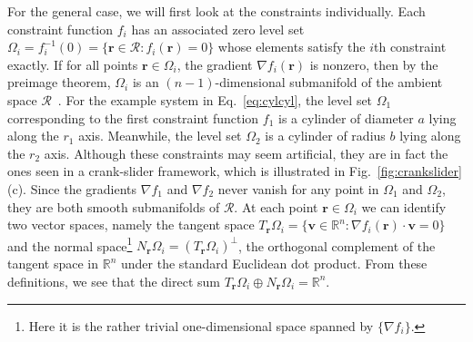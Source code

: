 For the general case, we will first look at the constraints individually.
Each constraint function $f_i$ has an associated zero level set $\Omega_i = f_i^{-1}(0) = \{\bm{r} \in \mathscr{R}: f_i(\bm{r}) = 0\}$ whose elements satisfy the $i$th constraint exactly.
If for all points $\bm{r} \in \Omega_{i}$, the gradient $\nabla f_i(\bm{r})$ is nonzero, then by the preimage theorem, $\Omega_i$ is an $(n-1)$-dimensional submanifold of the ambient space $\mathscr{R}$~\cite{guillemin1974,lee2013}.
For the example system in Eq.~\eqref{eq:cylcyl}, the level set $\Omega_1$ corresponding to the first constraint function $f_1$ is a cylinder of diameter $a$ lying along the $r_{1}$ axis.
Meanwhile, the level set $\Omega_2$ is a cylinder of radius $b$ lying along the $r_{2}$ axis.
Although these constraints may seem artificial, they are in fact the ones seen in a crank-slider framework, which is illustrated in Fig.~\ref{fig:crankslider}(c).
Since the gradients $\nabla f_1$ and $\nabla f_2$ never vanish for any point in $\Omega_1$ and $\Omega_2$, they are both smooth submanifolds of $\mathscr{R}$.
At each point $\bm{r} \in \Omega_i$ we can identify two vector spaces, namely the tangent space $T_{\bm{r}}\Omega_i = \{\bm{v} \in \mathbb{R}^n: \nabla f_i(\bm{r})\cdot \bm{v} = 0\}$ and the normal space\footnote{Here it is the rather trivial one-dimensional space spanned by $\{\nabla f_i\}$.} $N_{\bm{r}}\Omega_i = (T_{\bm{r}}\Omega_i)^\perp$, the orthogonal complement of the tangent space in $\mathbb{R}^n$ under the standard Euclidean dot product.
From these definitions, we see that the direct sum $T_{\bm{r}}\Omega_i\oplus N_{\bm{r}}\Omega_i = \mathbb{R}^n$.


